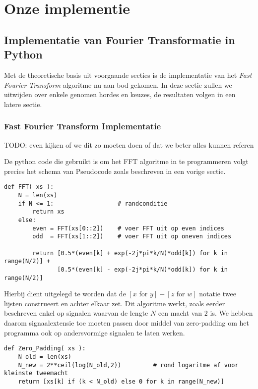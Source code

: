 \chapter{Onze implementie}

\section{Implementatie van Fourier Transformatie in Python}
Met de theoretische basis uit voorgaande secties is de implementatie van het \emph{Fast Fourier Transform} algoritme
nu aan bod gekomen. In deze sectie zullen we uitwijden over enkele genomen hordes en keuzes, de resultaten volgen
in een latere sectie.

\subsection{Fast Fourier Transform Implementatie}
TODO: even kijken of we dit zo moeten doen of dat we beter alles kunnen referen

De python code die gebruikt is om het FFT algoritme in te programmeren volgt precies het schema van Pseudocode
zoals beschreven in een vorige sectie.

\begin{lstlisting}[caption={FFT algoritme in Python, voert de pseudocode uit zoals in sectie (TODO)}]
def FFT( xs ):
    N = len(xs)
    if N <= 1:                  # randconditie
        return xs
    else:
        even = FFT(xs[0::2])    # voer FFT uit op even indices
        odd  = FFT(xs[1::2])    # voer FFT uit op oneven indices

        return [0.5*(even[k] + exp(-2j*pi*k/N)*odd[k]) for k in range(N/2)] + 
               [0.5*(even[k] - exp(-2j*pi*k/N)*odd[k]) for k in range(N/2)]
\end{lstlisting}

Hierbij dient uitgelegd te worden dat de $[x \text{ for } y] + [z \text{ for } w]$ notatie twee lijsten construeert en achter elkaar zet. Dit algoritme werkt, zoals eerder beschreven enkel op signalen waarvan de lengte
$N$ een macht van $2$ is. We hebben daarom signaalextensie toe moeten passen door middel van zero-padding
om het programma ook op andersvormige signalen te laten werken.

\begin{lstlisting}[caption={Zero-Padding algoritme in Python, voegt nullen toe tot een tweemacht is bereikt}]
def Zero_Padding( xs ):
    N_old = len(xs)
    N_new = 2**ceil(log(N_old,2))         # rond logaritme af voor kleinste tweemacht
    return [xs[k] if (k < N_old) else 0 for k in range(N_new)]
\end{lstlisting}

